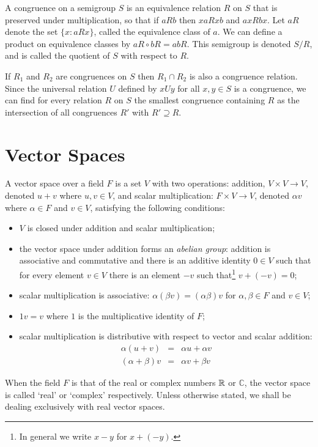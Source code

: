 \begin{defn}[Congruence] 
A congruence on a semigroup $S$ is an equivalence relation $R$ on $S$ that is preserved under multiplication, so that if $aRb$ then $xaRxb$ and $axRbx$. Let $aR$ denote the set $\{x : aRx\}$, called the equivalence class of $a$. We can define a product on equivalence classes by $aR \circ bR = abR$. This semigroup is denoted $S/R$, and is called the quotient of $S$ with respect to $R$.

If $R_1$ and $R_2$ are congruences on $S$ then $R_1 \cap R_2$ is also a congruence relation. Since the universal relation $U$ defined by $xUy$ for all $x,y \in S$ is a congruence, we can find for every relation $R$ on $S$ the smallest congruence containing $R$ as the intersection of all congruences $R'$ with $R' \supseteq R$.
\end{defn}


\section{Vector Spaces}
\label{vectors}

\begin{defn}
A vector space over a field $F$ is a set $V$ with two operations: addition, $V \times V \rightarrow V$, denoted $u + v$ where $u,v \in V$, and scalar multiplication: $F \times V \rightarrow V$, denoted $\alpha v$ where $\alpha \in F$ and $v \in V$,
satisfying the following conditions:
\begin{itemize}
\item $V$ is closed under addition and scalar multiplication;
\item the vector space under addition forms an \emph{abelian group}: addition is associative and commutative and there is an additive identity $0 \in V$ such that for every element $v \in V$ there is an element $-v$ such that\footnote{In general we write $x - y$ for $x + (-y)$.} $v + (-v) = 0$;
\item scalar multiplication is associative: $\alpha (\beta v) = (\alpha \beta) v$ for $\alpha, \beta \in F$ and $v \in V$;
\item $1v = v$ where $1$ is the multiplicative identity of $F$;
\item scalar multiplication is distributive with respect to vector and scalar addition:
\begin{eqnarray*}
\alpha(u + v) & = & \alpha u + \alpha v\\
(\alpha + \beta)v & = & \alpha v + \beta v
\end{eqnarray*}
\end{itemize}
When the field $F$ is that of the real or complex numbers $\mathbb{R}$ or $\mathbb{C}$, the vector space is called `real' or `complex' respectively. Unless otherwise stated, we shall be dealing exclusively with real vector spaces.
\end{defn}

